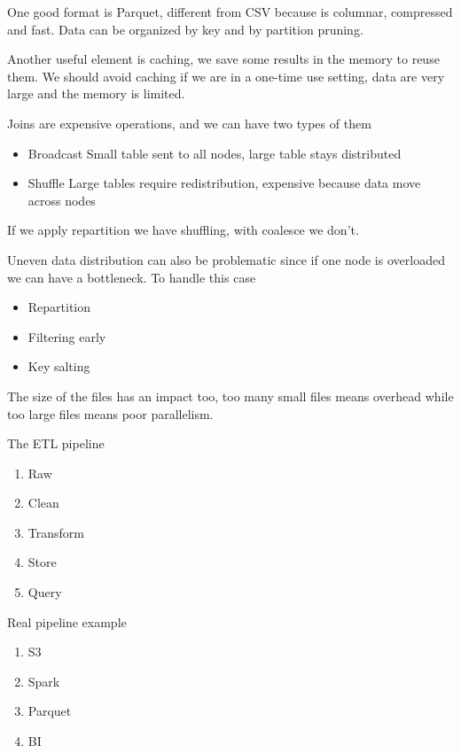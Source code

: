 One good format is Parquet, different from CSV because is columnar, compressed and fast. Data can be organized by key and by partition pruning.

Another useful element is caching, we save some results in the memory to reuse them. We should avoid caching if we are in a one-time use setting, data are very large and the memory is limited. 

\vspace{10pt}

Joins are expensive operations, and we can have two types of them

\begin{itemize}
    \item Broadcast \ra Small table sent to all nodes, large table stays distributed
    \item Shuffle \ra Large tables require redistribution, expensive because data move across nodes
\end{itemize}

If we apply repartition we have shuffling, with coalesce we don't.

\vspace{10pt}

Uneven data distribution can also be problematic since if one node is overloaded we can have a bottleneck. To handle this case

\begin{itemize}
    \item Repartition
    \item Filtering early
    \item Key salting
\end{itemize}

The size of the files has an impact too, too many small files means overhead while too large files means poor parallelism.

\vspace{10pt}

The ETL pipeline 

\begin{enumerate}
    \item Raw
    \item Clean
    \item Transform
    \item Store
    \item Query
\end{enumerate}

Real pipeline example

\begin{enumerate}
    \item S3
    \item Spark
    \item Parquet
    \item BI
\end{enumerate}

